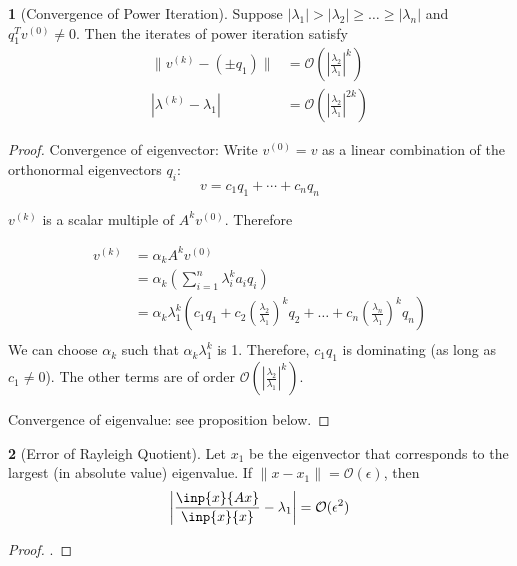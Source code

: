 \documentclass[12pt]{article}
\theoremstyle{definition}
\newcommand{\e}{\epsilon}
\newcommand{\norm}[1]{\lVert#1\rVert}
\newtheorem{theorem}{\color{ForestGreen}{\textbf{Theorem}}}
\theoremstyle{definition}
\begin{document}
\begin{theorem}[Convergence of Power Iteration]
Suppose $|\lambda_1|  > |\lambda_2| \geq \ldots \geq |\lambda_n|$ and $q_1^T v^{(0)} \neq 0$. Then the iterates of power iteration satisfy
\begin{align}
	\norm{v^{(k)} - (\pm q_1)} &= \mathcal{O}\left( \left\vert \frac{\lambda_2}{\lambda_1} \right\vert^k \right) \tag{error of eigenvector} \\
	|\lambda^{(k)} - \lambda_1 | &= \mathcal{O}\left( \left\vert \frac{\lambda_2}{\lambda_1} \right\vert^{2k} \right) \tag{error of eigenvalue}
\end{align}
\end{theorem}

\begin{proof}

Convergence of eigenvector: Write $v^{(0)} = v$ as a linear combination of the orthonormal eigenvectors $q_i$:
\begin{equation}
	v = c_1 q_1 + \cdots + c_nq_n
\end{equation}

$v^{(k)}$ is a scalar multiple of $A^k v^{(0)}$. Therefore

\begin{align*}
	v^{(k)} &= \alpha_k A^k v^{(0)} \tag{$\alpha_k$ a normalization constant} \\
	&= \alpha_k \left(\sum_{i=1}^n \lambda_i^k a_i q_i \right) \\
	&= \alpha_k \lambda_1^k \left( c_1q_1 + c_2 \left(\frac{\lambda_2}{\lambda_1} \right)^k q_2 + \ldots + c_n \left(\frac{\lambda_n}{\lambda_1} \right)^k q_n \right) \\
\end{align*}
We can choose $\alpha_k$ such that $\alpha_k \lambda_1^k$ is 1. Therefore, $c_1 q_1$ is dominating (as long as $c_1 \neq 0$). The other terms are of order $\mathcal{O}\left( \left\vert \frac{\lambda_2}{\lambda_1} \right\vert^k \right)$.

Convergence of eigenvalue: see proposition below.

\end{proof}

\begin{theorem}[Error of Rayleigh Quotient]
Let $x_1$ be the eigenvector that corresponds to the largest (in absolute value) eigenvalue. If $\norm{x - x_1} = \mathcal{O}(\e)$, then
\begin{equation}
	\left\vert \frac{\inp{x}{Ax}}{\inp{x}{x}}  - \lambda_1 \right\vert = \mathcal{O}(\e^2)
\end{equation}
\end{theorem}
\begin{proof}
\color{Red}{TODO}. 
\end{proof}
\end{document}
